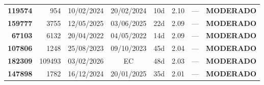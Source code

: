 \documentclass[a4paper,10pt]{article}
\begin{document}
\begin{center}
\begin{longtable}{>{\scriptsize}r>{\scriptsize}r>{\scriptsize}c>{\scriptsize}c>{\scriptsize}r>{\scriptsize}r>{\scriptsize}r>{\scriptsize}l}
\textcolor{anomyellow}{\textbf{119574}} & 954 & 10/02/2024 & 20/02/2024 & 10d & \textcolor{anomyellow}{2.10} & --- & \textcolor{anomyellow}{\textbf{MODERADO}} \\

\textcolor{anomyellow}{\textbf{159777}} & 3755 & 12/05/2025 & 03/06/2025 & 22d & \textcolor{anomyellow}{2.09} & --- & \textcolor{anomyellow}{\textbf{MODERADO}} \\

\textcolor{anomyellow}{\textbf{67103}} & 6132 & 20/04/2022 & 04/05/2022 & 14d & \textcolor{anomyellow}{2.09} & --- & \textcolor{anomyellow}{\textbf{MODERADO}} \\

\textcolor{anomyellow}{\textbf{107806}} & 1248 & 25/08/2023 & 09/10/2023 & 45d & \textcolor{anomyellow}{2.04} & --- & \textcolor{anomyellow}{\textbf{MODERADO}} \\

\textcolor{anomyellow}{\textbf{182309}} & 109493 & 03/02/2026 & \textcolor{anomorange}{EC} & 48d & \textcolor{anomyellow}{2.03} & --- & \textcolor{anomyellow}{\textbf{MODERADO}} \\

\textcolor{anomyellow}{\textbf{147898}} & 1782 & 16/12/2024 & 20/01/2025 & 35d & \textcolor{anomyellow}{2.01} & --- & \textcolor{anomyellow}{\textbf{MODERADO}} \\

\end{longtable}\end{center}
\end{document}

